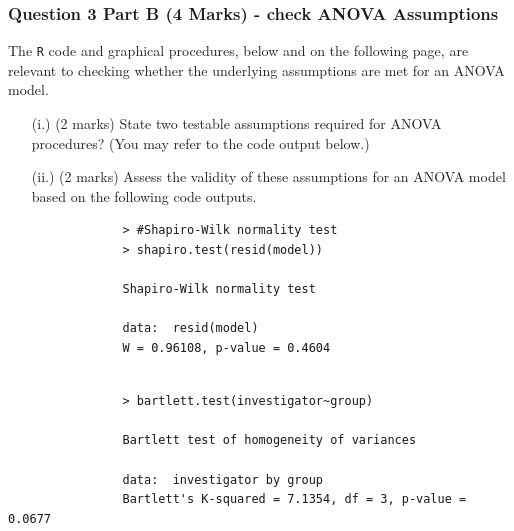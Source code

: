 \documentclass[a4paper,12pt]{article}
\begin{document}
	\newpage
	\normalsize{

		\subsubsection*{Question 3 Part B (4 Marks) - check ANOVA Assumptions}
		The \texttt{R} code and graphical procedures, below and on the following page, are relevant to checking whether the underlying assumptions are met for an ANOVA model.
		\begin{itemize}
			\item[(i.)] (2 marks) State two testable assumptions required for ANOVA procedures? (You may refer to the code output below.)
			\item[(ii.)] (2 marks)  Assess the validity of these assumptions for an ANOVA model based on the following code outputs.
			
		\end{itemize}
		{
			\normalsize
			\begin{framed}
				\begin{verbatim}
				> #Shapiro-Wilk normality test
				> shapiro.test(resid(model))
				
				Shapiro-Wilk normality test
				
				data:  resid(model)
				W = 0.96108, p-value = 0.4604
				
				\end{verbatim}
			\end{framed}
			\begin{framed}
				\begin{verbatim}
				> bartlett.test(investigator~group)
				
				Bartlett test of homogeneity of variances
				
				data:  investigator by group
				Bartlett's K-squared = 7.1354, df = 3, p-value = 0.0677
				
				\end{verbatim}
			\end{framed}
		}
	}
	\newpage
	
\end{document}
